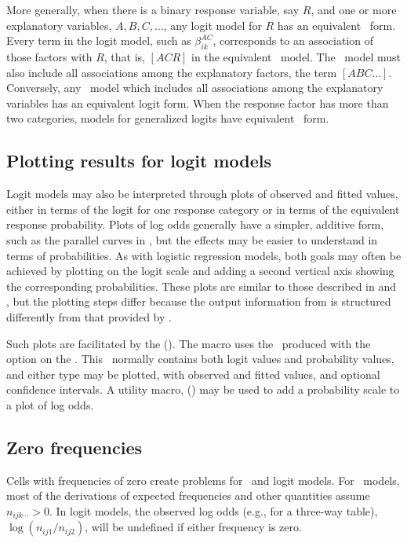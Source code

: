 More generally, when there is a binary response variable, say $R$, and
one or more explanatory variables, $A, B, C, \dots$, any logit model
for $R$ has an equivalent \loglin\ form.
Every term in the logit model, such as $\beta_{ik}^{AC}$, corresponds to
an association of those factors with $R$, that is, $[ACR]$ in the
equivalent \loglin\ model.  The \loglin\ model must also include all
associations among the explanatory factors, the term $[A B C \dots]$.
Conversely, any \loglin\ model which includes all associations among
the explanatory variables has an equivalent logit form.
When the response factor has more than two categories, models for
generalized logits have equivalent \loglin\ form.



\subsection{Plotting results for logit models}

Logit models may also be interpreted through plots of observed and
fitted values, either in terms of the logit for one response category
or in terms of the equivalent response probability.
Plots of log odds generally have a simpler, additive form, such as
the parallel curves in ,
but the effects may be easier to understand in terms of
probabilities.
As with logistic regression models, both goals may often be
achieved by plotting on the logit scale and adding a second vertical
axis showing the corresponding probabilities.
These plots are similar to those described in 
and , but the plotting steps differ because
the output information from  is structured differently
from that provided by .

Such plots are facilitated by the  ().
The macro uses the \ODS\  produced with the  option on the .
This \Dset\ normally contains both logit values
and probability values, and either type may be plotted, with observed
and fitted values, and optional confidence intervals.
A utility macro,  () may be used to add a probability scale
to a plot of log odds.


\subsection{Zero frequencies}
Cells with frequencies of zero create problems for \loglin\ and logit
models.  For \loglin\ models, most of the derivations of expected
frequencies and other quantities assume $n_{ijk\cdots} > 0$.
In logit models, the observed log odds (e.g., for a three-way table),
$\log ( n_{ij1} / n_{ij2} )$, will be undefined if either frequency is
zero.

